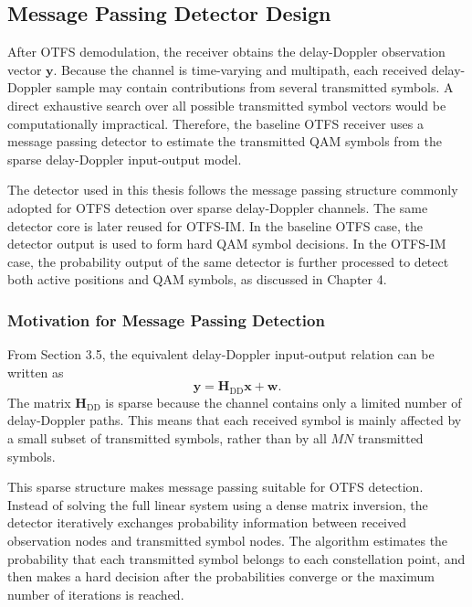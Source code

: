 \subsection{Message Passing Detector Design}

After OTFS demodulation, the receiver obtains the delay-Doppler observation vector \(\mathbf{y}\). Because the channel is time-varying and multipath, each received delay-Doppler sample may contain contributions from several transmitted symbols. A direct exhaustive search over all possible transmitted symbol vectors would be computationally impractical. Therefore, the baseline OTFS receiver uses a message passing detector to estimate the transmitted QAM symbols from the sparse delay-Doppler input-output model.

The detector used in this thesis follows the message passing structure commonly adopted for OTFS detection over sparse delay-Doppler channels. The same detector core is later reused for OTFS-IM. In the baseline OTFS case, the detector output is used to form hard QAM symbol decisions. In the OTFS-IM case, the probability output of the same detector is further processed to detect both active positions and QAM symbols, as discussed in Chapter 4.

\subsubsection{Motivation for Message Passing Detection}

From Section 3.5, the equivalent delay-Doppler input-output relation can be written as
\begin{equation}
    \mathbf{y}
    =
    \mathbf{H}_{\mathrm{DD}}\mathbf{x}
    +
    \mathbf{w}.
\end{equation}
The matrix \(\mathbf{H}_{\mathrm{DD}}\) is sparse because the channel contains only a limited number of delay-Doppler paths. This means that each received symbol is mainly affected by a small subset of transmitted symbols, rather than by all \(MN\) transmitted symbols.

This sparse structure makes message passing suitable for OTFS detection. Instead of solving the full linear system using a dense matrix inversion, the detector iteratively exchanges probability information between received observation nodes and transmitted symbol nodes. The algorithm estimates the probability that each transmitted symbol belongs to each constellation point, and then makes a hard decision after the probabilities converge or the maximum number of iterations is reached.

